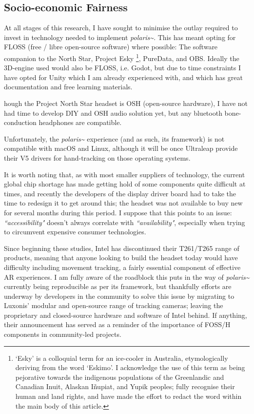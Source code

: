 \subsection{Socio-economic Fairness}\label{sec: polaris-ethics-}
At all stages of this research, I have sought to minimise the outlay required to invest in technology needed to implement \textit{polaris\textasciitilde{}}. This has meant opting for FLOSS (free / libre open-source software) where possible: The software companion to the North Star, Project Esky \footnote{`Esky' is a colloquial term for an ice-cooler in Australia, etymologically deriving from the word ‘Eskimo’. I acknowledge the use of this term as being pejorative towards the indigenous populations of the Greenlandic and Canadian Inuit, Alaskan Iñupiat, and Yupik peoples; fully recognise their human and land rights, and have made the effort to redact the word within the main body of this article.}, PureData, and OBS. Ideally the 3D-engine used would also be FLOSS, i.e. Godot, but due to time constraints I have opted for Unity which I am already experienced with, and which has great documentation and free learning materials.

hough the Project North Star headset is OSH (open-source hardware), I have not had time to develop DIY and OSH audio solution yet, but any bluetooth bone-conduction headphones are compatible.

Unfortunately, the \textit{polaris\textasciitilde{}} experience (and as such, its framework) is not compatible with macOS and Linux, although it will be once Ultraleap provide their V5 drivers for hand-tracking on those operating systems.

It is worth noting that, as with most smaller suppliers of technology, the current global chip shortage has made getting hold of some components quite difficult at times, and recently the developers of the display driver board had to take the time to redesign it to get around this; the headset was not available to buy new for several months during this period. I suppose that this points to an issue: \textit{``accessibility"} doesn’t always correlate with \textit{``availability"}, especially when trying to circumvent expensive consumer technologies.

Since beginning these studies, Intel has discontinued their T261/T265 range of products, meaning that anyone looking to build the headset today would have difficulty including movement tracking, a fairly essential component of effective AR experiences. I am fully aware of the roadblock this puts in the way of \textit{polaris\textasciitilde{}} currently being reproducible as per its framework, but thankfully efforts are underway by developers in the community to solve this issue by migrating to Luxonis’ modular and open-source range of tracking cameras; leaving the proprietary and closed-source hardware and software of Intel behind. If anything, their announcement has served as a reminder of the importance of FOSS/H components in community-led projects.

